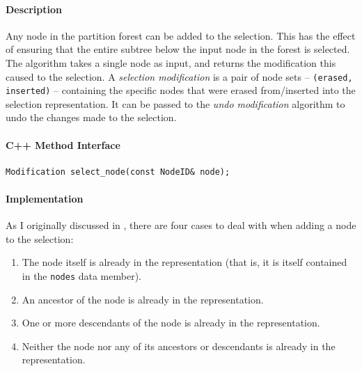
\paragraph{Description}

Any node in the partition forest can be added to the selection. This has the effect of ensuring that the entire subtree below the input node in the forest is selected. The algorithm takes a single node as input, and returns the modification this caused to the selection. A \emph{selection modification} is a pair of node sets -- \texttt{(erased, inserted)} -- containing the specific nodes that were erased from/inserted into the selection representation. It can be passed to the \emph{undo modification} algorithm to undo the changes made to the selection.

\paragraph{C++ Method Interface}

\begin{lstlisting}[style=Prototype]
Modification select_node(const NodeID& node);
\end{lstlisting}

\paragraph{Implementation}

As I originally discussed in \cite{gvcispa09}, there are four cases to deal with when adding a node to the selection:

\begin{enumerate}

\item The node itself is already in the representation (that is, it is itself contained in the \texttt{nodes} data member).
\item An ancestor of the node is already in the representation.
\item One or more descendants of the node is already in the representation.
\item Neither the node nor any of its ancestors or descendants is already in the representation.

\end{enumerate}

